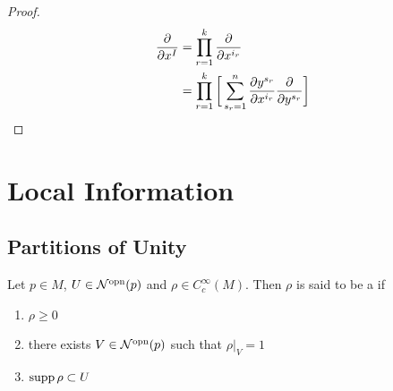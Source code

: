 \documentclass{book}
\begin{document}
\begin{proof}
	\begin{align*}
		\frac{\partial}{\partial x^I}
		& = \prod_{r=1}^k \frac{\partial}{\partial x^{i_r}} \\
		& = \prod_{r=1}^k \bigg[ \sum_{s_r = 1}^n  \frac{\partial y^{s_r}}{\partial x^{i_r}} \frac{\partial}{\partial y^{s_r}} \bigg] \\
	\end{align*}
\end{proof}




























































\newpage 
\section{Local Information}

\subsection{Partitions of Unity}

\begin{defn}
	Let $p \in M$, $U \in {\mathcal{N}}^{\text{opn}}(p)$ and $\rho \in C_c^{\infty}(M)$. Then $\rho$ is said to be a  if 
	\begin{enumerate}
		\item $\rho \geq 0$ 
		\item there exists $V \in {\mathcal{N}}^{\text{opn}}(p)$ such that $\rho|_V = 1$ 
		\item $\operatorname{supp} \rho \subset U$
	\end{enumerate}
	
\end{defn}
\end{document}
